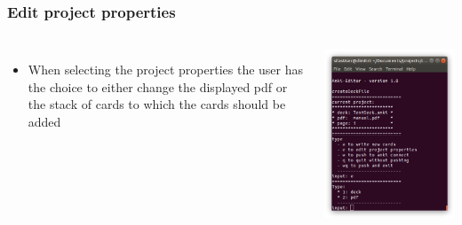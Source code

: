 \documentclass[xcolor=dvipanames]{beamer}
\begin{document}
	\begin{frame}
		\frametitle{Edit project properties}
		\begin{columns}
				\begin{itemize}
					\item{When selecting the project properties the user has the choice to either change the displayed pdf or the stack of cards to which the cards should be added}
				\end{itemize}
			
				\includegraphics[scale=.35]{./img/editProperties_menu.png}
		\end{columns}
	\end{frame}
	
\end{document}
